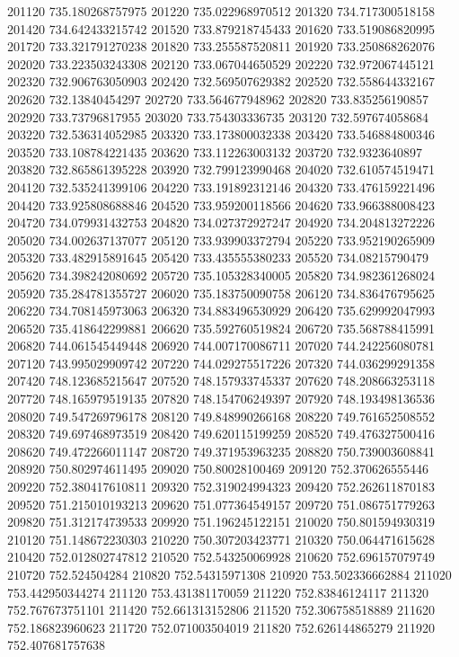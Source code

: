 {201120 735.180268757975
201220 735.022968970512
201320 734.717300518158
201420 734.642433215742
201520 733.879218745433
201620 733.519086820995
201720 733.321791270238
201820 733.255587520811
201920 733.250868262076
202020 733.223503243308
202120 733.067044650529
202220 732.972067445121
202320 732.906763050903
202420 732.569507629382
202520 732.558644332167
202620 732.13840454297
202720 733.564677948962
202820 733.835256190857
202920 733.73796817955
203020 733.754303336735
203120 732.597674058684
203220 732.536314052985
203320 733.173800032338
203420 733.546884800346
203520 733.108784221435
203620 733.112263003132
203720 732.9323640897
203820 732.865861395228
203920 732.799123990468
204020 732.610574519471
204120 732.535241399106
204220 733.191892312146
204320 733.476159221496
204420 733.925808688846
204520 733.959200118566
204620 733.966388008423
204720 734.079931432753
204820 734.027372927247
204920 734.204813272226
205020 734.002637137077
205120 733.939903372794
205220 733.952190265909
205320 733.482915891645
205420 733.435555380233
205520 734.08215790479
205620 734.398242080692
205720 735.105328340005
205820 734.982361268024
205920 735.284781355727
206020 735.183750090758
206120 734.836476795625
206220 734.708145973063
206320 734.883496530929
206420 735.629992047993
206520 735.418642299881
206620 735.592760519824
206720 735.568788415991
206820 744.061545449448
206920 744.007170086711
207020 744.242256080781
207120 743.995029909742
207220 744.029275517226
207320 744.036299291358
207420 748.123685215647
207520 748.157933745337
207620 748.208663253118
207720 748.165979519135
207820 748.154706249397
207920 748.193498136536
208020 749.547269796178
208120 749.848990266168
208220 749.761652508552
208320 749.697468973519
208420 749.620115199259
208520 749.476327500416
208620 749.472266011147
208720 749.371953963235
208820 750.739003608841
208920 750.802974611495
209020 750.80028100469
209120 752.370626555446
209220 752.380417610811
209320 752.319024994323
209420 752.262611870183
209520 751.215010193213
209620 751.077364549157
209720 751.086751779263
209820 751.312174739533
209920 751.196245122151
210020 750.801594930319
210120 751.148672230303
210220 750.307203423771
210320 750.064471615628
210420 752.012802747812
210520 752.543250069928
210620 752.696157079749
210720 752.524504284
210820 752.54315971308
210920 753.502336662884
211020 753.442950344274
211120 753.431381170059
211220 752.83846124117
211320 752.767673751101
211420 752.661313152806
211520 752.306758518889
211620 752.186823960623
211720 752.071003504019
211820 752.626144865279
211920 752.407681757638
}
